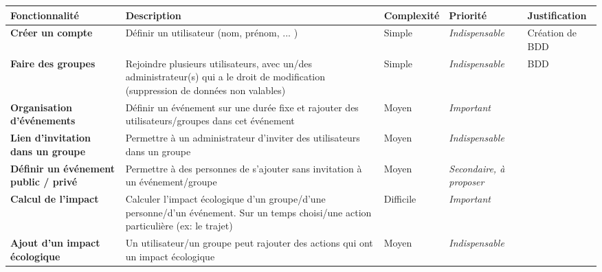 



\begin{table}[h]
\centering
\begin{tabularx}{\textwidth}{|X|X|X|X|X|}
    \hline
    \textbf{Fonctionnalité} & \textbf{Description} & \textbf{Complexité} & \textbf{Priorité} & \textbf{Justification} \\
    \hline
    \textbf{Créer un compte} & Définir un utilisateur (nom, prénom, ... ) & Simple & \textit{Indispensable} & Création de BDD \\
    \hline
    \textbf{Faire des groupes} & Rejoindre plusieurs utilisateurs, avec un/des administrateur(s) qui a le droit de modification (suppression de données non valables) & Simple & \textit{Indispensable} & BDD \\
    \hline
    \textbf{Organisation d'événements} & Définir un événement sur une durée fixe et rajouter des utilisateurs/groupes dans cet événement & Moyen & \textit{Important} & \\
    \hline
    \textbf{Lien d'invitation dans un groupe} & Permettre à un administrateur d'inviter des utilisateurs dans un groupe & Moyen & \textit{Indispensable} & \\
    \hline
    \textbf{Définir un événement public / privé} & Permettre à des personnes de s'ajouter sans invitation à un événement/groupe & Moyen & \textit{Secondaire, à proposer} & \\
    \hline
    \textbf{Calcul de l'impact} & Calculer l'impact écologique d'un groupe/d'une personne/d'un événement. Sur un temps choisi/une action particulière (ex: le trajet) & Difficile & \textit{Important} & \\
    \hline
    \textbf{Ajout d'un impact écologique} & Un utilisateur/un groupe peut rajouter des actions qui ont un impact écologique & Moyen & \textit{Indispensable} & \\
    \hline
\end{tabularx}
\end{table}

\newpage 

